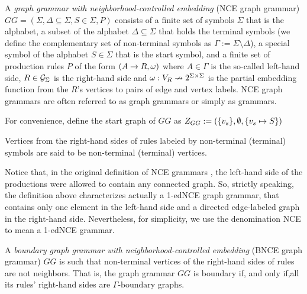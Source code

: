 \begin{definition}
	\label{def:gg}
	A \emph{graph grammar with neighborhood-controlled embedding} (NCE graph grammar) $GG = (\Sigma, \Delta \subseteq \Sigma, S \in \Sigma, P)$ consists of a finite set of symbols $\Sigma$ that is the alphabet, a subset of the alphabet $\Delta \subseteq \Sigma$ that holds the terminal symbols (we define the complementary set of non-terminal symbols as $\Gamma := \Sigma \setminus \Delta$), a special symbol of the alphabet $S \in \Sigma$ that is the start symbol, and a finite set of production rules $P$ of the form $(A \to R, \omega)$ where $A \in \Gamma$ is the so-called left-hand side, $R \in \mathcal{G}_{\Sigma}$ is the right-hand side and $\omega : V_R \nrightarrow 2^{\Sigma \times \Sigma}$ is the partial embedding function from the $R$'s vertices to pairs of edge and vertex labels. NCE graph grammars are often referred to as graph grammars or simply as grammars.
	
	For convenience, define the start graph of $GG$ as $Z_{GG} := (\{v_s\},\emptyset,\{v_s \mapsto S\})$
	
	Vertices from the right-hand sides of rules labeled by non-terminal (terminal) symbols are said to be non-terminal (terminal) vertices.
\end{definition}

Notice that, in the original definition of NCE grammars \cite{janssens1982graph}, the left-hand side of the productions were allowed to contain any connected graph. So, strictly speaking, the definition above characterizes actually a 1-edNCE graph grammar, that contains only one element in the left-hand side and a directed edge-labeled graph in the right-hand side. Nevertheless, for simplicity, we use the denomination NCE to mean a 1-edNCE grammar.

\begin{definition}
	A \emph{boundary graph grammar with neighborhood-controlled embedding} (BNCE graph grammar) $GG$ is such that non-terminal vertices of the right-hand sides of rules are not neighbors. That is, the graph grammar $GG$ is boundary if, and only if,all its rules' right-hand sides are $\Gamma\text{-boundary}$ graphs.
\end{definition}


